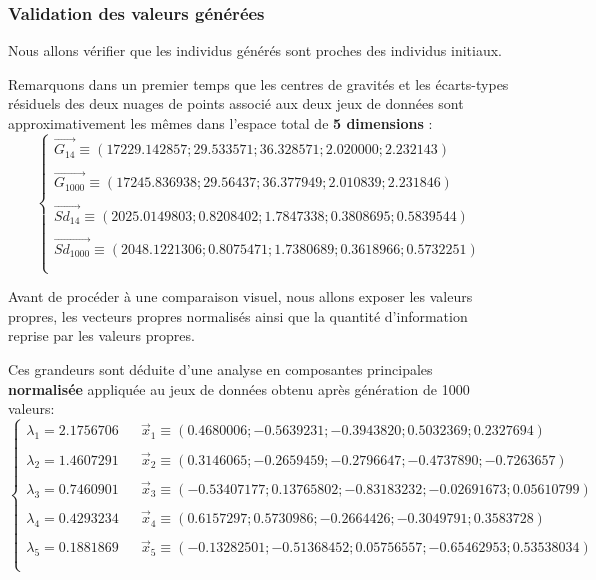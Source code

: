 \documentclass[a4paper]{article}
\begin{document}
\newpage
\subsubsection{Validation des valeurs générées}

Nous allons vérifier que les individus générés sont proches des individus initiaux.

Remarquons dans un premier temps  que les centres de gravités et les écarts-types résiduels des deux nuages de points associé aux deux jeux de données sont approximativement les mêmes dans  l'espace total de \textbf{5 dimensions} :
\[
\left\lbrace 
\begin{array}{lcl} 
\vec{G_{14}}\equiv (17229.142857   ;29.533571 ;36.328571 ; 2.020000 ; 2.232143) \\ \\
\vec{G_{1000}}\equiv (17245.836938;29.56437; 36.377949; 2.010839;2.231846)\\  \\
\vec{Sd_{14}}\equiv (2025.0149803;0.8208402; 1.7847338; 0.3808695 ;0.5839544) \\  \\
\vec{Sd_{1000}}\equiv  (2048.1221306 ; 0.8075471 ;1.7380689; 0.3618966; 0.5732251)\\  \\

\end{array}\right.
\]


Avant de procéder à une comparaison visuel, nous allons exposer les valeurs propres, les vecteurs propres normalisés ainsi que la quantité d'information reprise par les valeurs propres. 

Ces grandeurs sont déduite d'une analyse en composantes principales \textbf{normalisée} appliquée au jeux de données obtenu après génération de 1000 valeurs:
\[
\left\lbrace 
\begin{array}{lcl} 
\lambda_{1}= 2.1756706  &&       \vec{x}_{1}\equiv (0.4680006 ; -0.5639231;-0.3943820 ;0.5032369  ;    0.2327694 )  \\ \\
\lambda_{2}= 1.4607291     &&     \vec{x}_{2}\equiv ( 0.3146065 ; -0.2659459  ;-0.2796647 ;-0.4737890; -0.7263657 )     \\ \\

\lambda_{3}=  0.7460901  &&       \vec{x}_{3}\equiv ( -0.53407177 ;  0.13765802; -0.83183232 ; -0.02691673 ; 0.05610799 )  \\ \\

\lambda_{4}=   0.4293234  &&   \vec{x}_{4}\equiv ( 0.6157297;0.5730986; -0.2664426; -0.3049791 ; 0.3583728 )\\ \\

\lambda_{5}=   0.1881869 &&   \vec{x}_{5}\equiv ( -0.13282501;-0.51368452; 0.05756557;-0.65462953; 0.53538034)\\ \\

\end{array}\right.
\]
 
\end{document}
